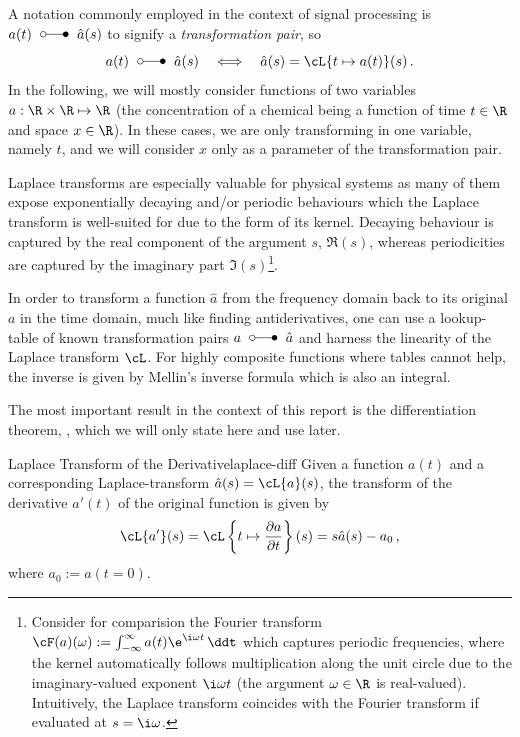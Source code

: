 \documentclass{prettytex/ox/mmsc-special-topic}
\begin{document}
  A notation commonly employed in the context of signal processing is $a(t) \;\laplace\; \hat{a}(s)$ to signify a \textit{transformation pair}, so
  $$a(t) \;\laplace\; \hat{a}(s) \quad\Longleftrightarrow\quad \hat{a}(s) = \cL\{t \mapsto a(t)\}(s)\,.$$
  In the following, we will mostly consider functions of two variables $a: \R \times \R \mapsto \R$ (the concentration of a chemical being a function of time $t \in \R$ and space $x \in \R$).
  In these cases, we are only transforming in one variable, namely $t$, and we will consider $x$ only as a parameter of the transformation pair.

  Laplace transforms are especially valuable for physical systems as many of them expose exponentially decaying and/or periodic behaviours which the Laplace transform is well-suited for due to the form of its kernel.
  Decaying behaviour is captured by the real component of the argument $s$, $\Re(s)$, whereas periodicities are captured by the imaginary part $\Im(s)$\footnote{Consider for comparision the Fourier transform $\cF(a)(\omega) := \int_{-\infty}^{\infty} a(t) \e^{\i \omega t} \,\ddt$ which captures periodic frequencies, where the kernel automatically follows multiplication along the unit circle due to the imaginary-valued exponent $\i\omega t$ (the argument $\omega \in \R$ is real-valued). Intuitively, the Laplace transform coincides with the Fourier transform if evaluated at $s = \i \omega$.}.

  In order to transform a function $\hat{a}$ from the frequency domain back to its original $a$ in the time domain, much like finding antiderivatives, one can use a lookup-table of known transformation pairs $a\;\laplace\;\hat{a}$ and harness the linearity of the Laplace transform $\cL$.
  For highly composite functions where tables cannot help, the inverse is given by Mellin's inverse formula which is also an integral.

  The most important result in the context of this report is the differentiation theorem, , which we will only state here and use later.

  \begin{theorem}{Laplace Transform of the Derivative}{laplace-diff}
    Given a function $a(t)$ and a corresponding Laplace-transform $\hat{a}(s) = \cL\{a\}(s)$, the transform of the derivative $a'(t)$ of the original function is given by
    $$\cL\{a'\}(s) = \cL\left\{t \mapsto \frac{\partial a}{\partial t}\right\}(s) = s\hat{a}(s) - a_0\,,$$
    where $a_0 := a(t=0)$.
  \end{theorem}
\end{document}

